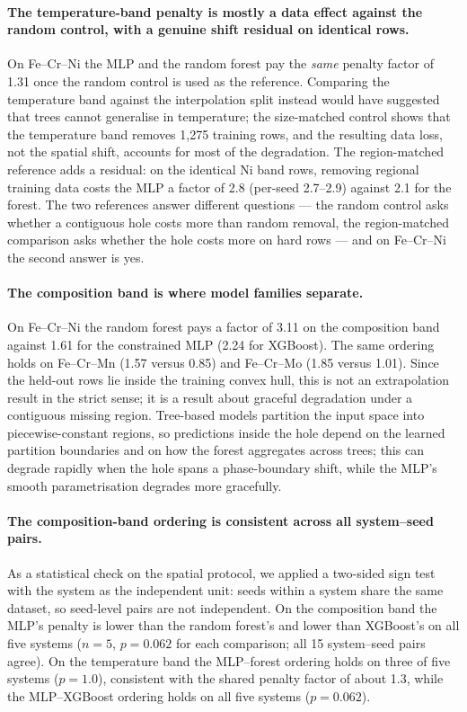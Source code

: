 \documentclass[preprint,12pt,authoryear]{elsarticle}
\begin{document}
\paragraph{The temperature-band penalty is mostly a data effect against
the random control, with a genuine shift residual on identical rows.}
On Fe--Cr--Ni the MLP and the random forest pay the \emph{same} penalty
factor of 1.31 once the random control is used as the reference. Comparing the
temperature band against the interpolation split instead would have
suggested that trees cannot generalise in temperature; the size-matched
control shows that the temperature band removes 1{,}275 training rows, and
the resulting data loss, not the spatial shift, accounts for most of the
degradation. The region-matched reference adds a residual: on the identical
Ni band rows, removing regional training data costs the MLP a factor of
2.8 (per-seed 2.7--2.9) against 2.1 for the forest. The two references
answer different questions --- the random control asks whether a
contiguous hole costs more than random removal, the region-matched
comparison asks whether the hole costs more on hard rows --- and on
Fe--Cr--Ni the second answer is yes.

\paragraph{The composition band is where model families separate.}
On Fe--Cr--Ni the random forest pays a factor of 3.11 on the composition band
against 1.61 for the constrained MLP (2.24 for XGBoost).
The same ordering holds on Fe--Cr--Mn (1.57 versus 0.85) and
Fe--Cr--Mo (1.85 versus 1.01). Since the held-out rows lie
inside the training convex hull, this is not an extrapolation result in the
strict sense; it is a result about graceful degradation under a contiguous
missing region. Tree-based models partition the input space into
piecewise-constant regions, so predictions inside the hole depend on the
learned partition boundaries and on how the forest aggregates across trees;
this can degrade rapidly when the hole spans a phase-boundary shift, while
the MLP's smooth parametrisation degrades more gracefully.

\paragraph{The composition-band ordering is consistent across all
system--seed pairs.}
As a statistical check on the spatial protocol, we applied a two-sided
sign test with the system as the independent unit: seeds within a system
share the same dataset, so seed-level pairs are not independent. On the
composition band the MLP's penalty is lower than the random forest's and
lower than XGBoost's on all five systems ($n = 5$, $p = 0.062$ for each
comparison; all 15 system--seed pairs agree). On the temperature band the
MLP--forest ordering holds on three of five systems ($p = 1.0$),
consistent with the shared penalty factor of about 1.3, while the
MLP--XGBoost ordering holds on all five systems ($p = 0.062$).
\end{document}
